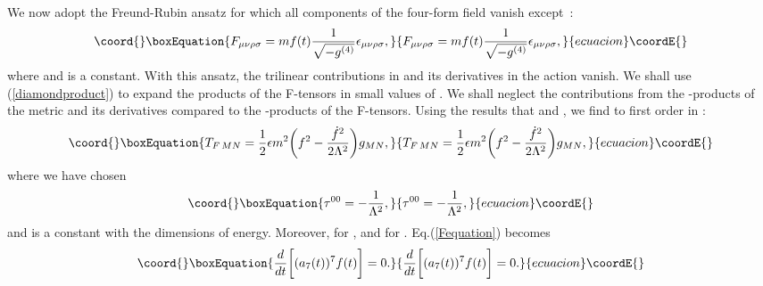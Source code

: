 \documentclass[a4paper,12pt]{article}
\begin{document}
We now adopt the Freund-Rubin ansatz for which all components of the
four-form field \coordHE{} vanish except~\cite{Freund,Freund2}:
\begin{equation}\coord{}\boxEquation{
F_{\mu\nu\rho\sigma}=mf(t)\frac{1}{\sqrt{-g^{(4)}}}\epsilon_{\mu\nu\rho\sigma},
}{
F_{\mu\nu\rho\sigma}=mf(t)\frac{1}{\sqrt{-g^{(4)}}}\epsilon_{\mu\nu\rho\sigma},
}{ecuacion}\coordE{}\end{equation}
where \coordHE{} and \coordHE{} is a constant. With this ansatz, the
trilinear contributions in \coordHE{} and its derivatives in the action
vanish. We shall use (\ref{diamondproduct}) to expand the products of the
F-tensors in small values of \coordHE{}. We shall neglect the
contributions from the \myHighlight{$\diamondsuit$}\coordHE{}-products of the metric \coordHE{} and
its derivatives compared to the \myHighlight{$\diamondsuit$}\coordHE{}-products of the F-tensors.
Using the results that
\coordHE{} and
\coordHE{},
we find to first order in \myHighlight{$\vert\tau\vert$}\coordHE{}:
\begin{equation}\coord{}\boxEquation{
T_{F\,MN}=\frac{1}{2}\epsilon
m^2\biggl(f^2-\frac{{\dot f}^2}{2\Lambda^2}\biggr)g_{MN},
}{
T_{F\,MN}=\frac{1}{2}\epsilon
m^2\biggl(f^2-\frac{{\dot f}^2}{2\Lambda^2}\biggr)g_{MN},
}{ecuacion}\coordE{}\end{equation}
where we have chosen
\begin{equation}\coord{}\boxEquation{
\tau^{00}=-\frac{1}{\Lambda^2},
}{
\tau^{00}=-\frac{1}{\Lambda^2},
}{ecuacion}\coordE{}\end{equation}
and \myHighlight{$\Lambda$}\coordHE{} is a constant with the dimensions of energy.
Moreover, \coordHE{} for \coordHE{}, and \coordHE{} for
\coordHE{}. Eq.(\ref{Fequation}) becomes
\begin{equation}\coord{}\boxEquation{
\frac{d}{dt}\biggl[(a_7(t))^7f(t)\biggr]=0.
}{
\frac{d}{dt}\biggl[(a_7(t))^7f(t)\biggr]=0.
}{ecuacion}\coordE{}\end{equation}
\end{document}
